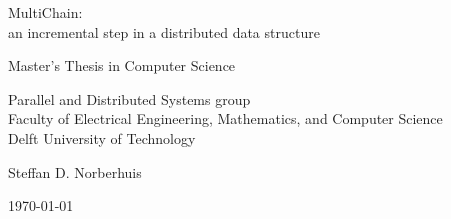 \begin{titlepage}

  \begin{center}
  \null\vfill
    \begin{center}
    \LARGE{MultiChain:\\
		an incremental step in a distributed data structure}
    \end{center}

    \vspace{3cm}

    \begin{large}
    Master's Thesis in Computer Science
    \end{large}

    \vspace{1.5cm}

    \begin{normalsize}
    Parallel and Distributed Systems group\\
    Faculty of Electrical Engineering, Mathematics, and Computer Science\\
    Delft University of Technology
    \end{normalsize}

    \vspace{2.0cm}

    \begin{normalsize}
    Steffan D. Norberhuis
    \end{normalsize}

    \vspace{1.0cm}

    \today            %

  \vfill
  \end{center}

\end{titlepage}

